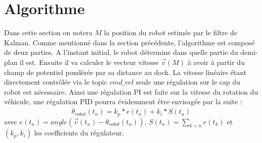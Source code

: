 \documentclass[12pt]{report}
\begin{document}
\section{Algorithme}

Dans cette section on notera $M$ la position du robot estimée par le filtre de Kalman. Comme mentionné dans la section précédente, l'algorithme est composé de deux parties. A l'instant initial, le robot détermine dans quelle partie du demi-plan il est. Ensuite il va calculer le vecteur vitesse $\overrightarrow{v}(M)$ à avoir à partir du champ de potentiel pondérée par sa distance au dock. La vitesse linéaire étant directement contrôlée via le topic $cmd\_vel$ seule une régulation sur le cap du robot est nécessaire. Ainsi une régulation PI est faite sur la vitesse du rotation du véhicule, une régulation PID pourra évidemment être envisagée par la suite : 
\[\dot{\theta}_{robot}(t_n)=k_p*e(t_n)+k_i*S(t_n)\]
avec $e(t_n)=angle(\overrightarrow{v}(t_n)-\theta_{robot}(t_n))$, $S(t_n) = \sum_{k<n}{e(t_k)}$ et $(k_p,k_i)$ les coefficients du régulateur. 
\end{document}
